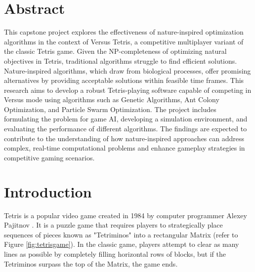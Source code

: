 \documentclass[a4paper, 12pt]{extreport}
\begin{document}
	
	\chapter*{Abstract}
	
	This capstone project explores the effectiveness of nature-inspired optimization algorithms in the context of Versus Tetris, a competitive multiplayer variant of the classic Tetris game. Given the NP-completeness of optimizing natural objectives in Tetris, traditional algorithms struggle to find efficient solutions. Nature-inspired algorithms, which draw from biological processes, offer promising alternatives by providing acceptable solutions within feasible time frames. This research aims to develop a robust Tetris-playing software capable of competing in Versus mode using algorithms such as Genetic Algorithms, Ant Colony Optimization, and Particle Swarm Optimization. The project includes formulating the problem for game AI, developing a simulation environment, and evaluating the performance of different algorithms. The findings are expected to contribute to the understanding of how nature-inspired approaches can address complex, real-time computational problems and enhance gameplay strategies in competitive gaming scenarios.
	
	
	\tableofcontents
	
	\listoftables
	
	\listoffigures
	
	\chapter{Introduction}
	
	
	Tetris is a popular video game created in 1984 by computer programmer Alexey Pajitnov  \cite{about-tetris}. It is a puzzle game that requires players to strategically place sequences of pieces known as "Tetriminos" into a rectangular Matrix (refer to Figure \ref{fig:tetrisgame}). In the classic game, players attempt to clear as many lines as possible by completely filling horizontal rows of blocks, but if the Tetriminos surpass the top of the Matrix, the game ends.
	
\end{document}
